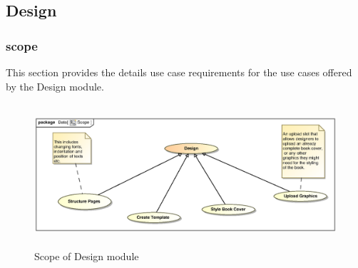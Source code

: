 \subsection{Design}

\subsubsection{scope}
\par{This section provides the details use case requirements for the use cases offered by the Design
module.}

\begin{figure}[h]
\includegraphics[height=200px, width=500px]{epsImages/Design/Scope.eps}
\caption{Scope of Design module}
\end{figure}

